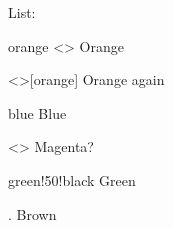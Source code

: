 \documentclass[a4paper, 11pt]{article}
\begin{document}
\begin{example}{}

    \begingroup
    \color{brown}
    List:
    \begin{boxedlist}
        \item[orange]<\ttfamily> Orange  %
        \item<\ttfamily>[orange] Orange again %
        \item[blue] Blue  %
        \item<> Magenta?  %
        \item[green!50!black] Green  %
        \item[.] Brown  %
    \end{boxedlist}
    \endgroup
\end{example}

\printindex
\end{document}
